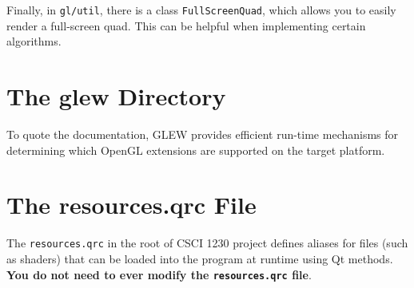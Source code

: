 \documentclass[landscape,twocolumn,letterpaper]{article}
\begin{document}
\noindent
Finally, in \texttt{gl/util}, there is a class \texttt{FullScreenQuad}, which allows you to easily render a full-screen quad. This can be helpful when implementing certain algorithms.

\section{The glew Directory}

To quote the documentation,  GLEW provides efficient run-time mechanisms for determining which OpenGL extensions are supported on the target platform.

\section{The resources.qrc File}

The \texttt{resources.qrc} in the root of CSCI 1230 project defines aliases for files (such as shaders) that can be loaded into the program at runtime using Qt methods. \textbf{You do not need to ever modify the \texttt{resources.qrc} file}.
\end{document}

